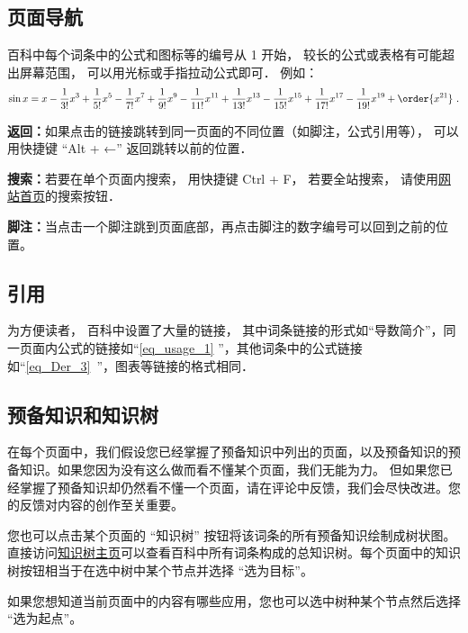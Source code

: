 
\subsection{页面导航}
百科中每个词条中的公式和图标等的编号从 1 开始， 较长的公式或表格有可能超出屏幕范围， 可以用光标或手指拉动公式即可． 例如：
\begin{equation}\label{eq_usage_1}
\sin x = x - \frac{1}{3!} x^3 + \frac{1}{5!} x^5 - \frac{1}{7!} x^7+\frac{1}{9!} x^9-\frac{1}{11!} x^{11}+\frac{1}{13!} x^{13}-\frac{1}{15!} x^{15}+\frac{1}{17!} x^{17}-\frac{1}{19!} x^{19}+ \order{x^{21}}~.
\end{equation}

\textbf{返回：}如果点击的链接跳转到同一页面的不同位置（如脚注，公式引用等）， 可以用快捷键 “Alt + ←” 返回跳转以前的位置．

\textbf{搜索：}若要在单个页面内搜索， 用快捷键 Ctrl + F， 若要全站搜索， 请使用\href{https://wuli.wiki}{网站首页}的搜索按钮．

\textbf{脚注：}当点击一个脚注跳到页面底部，再点击脚注的数字编号可以回到之前的位置。

\subsection{引用}
为方便读者， 百科中设置了大量的链接， 其中词条链接的形式如“导数简介”，同一页面内公式的链接如“\autoref{eq_usage_1} ”，其他词条中的公式链接如“\autoref{eq_Der_3}~”，图表等链接的格式相同．

\subsection{预备知识和知识树}
在每个页面中，我们假设您已经掌握了预备知识中列出的页面，以及预备知识的预备知识。如果您因为没有这么做而看不懂某个页面，我们无能为力。 但如果您已经掌握了预备知识却仍然看不懂一个页面，请在评论中反馈，我们会尽快改进。您的反馈对内容的创作至关重要。

您也可以点击某个页面的 “知识树” 按钮将该词条的所有预备知识绘制成树状图。 直接访问\href{https://wuli.wiki/tree/}{知识树主页}可以查看百科中所有词条构成的总知识树。每个页面中的知识树按钮相当于在选中树中某个节点并选择 “选为目标”。

如果您想知道当前页面中的内容有哪些应用，您也可以选中树种某个节点然后选择 “选为起点”。
